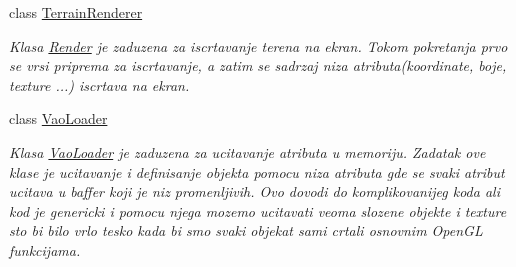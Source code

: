 \begin{DoxyCompactItemize}
class \hyperlink{classcore_1_1TerrainRenderer}{Terrain\+Renderer}
\begin{DoxyCompactList}\small\item\em Klasa \hyperlink{classcore_1_1Render}{Render} je zaduzena za iscrtavanje terena na ekran. Tokom pokretanja prvo se vrsi priprema za iscrtavanje, a zatim se sadrzaj niza atributa(koordinate, boje, texture ...) iscrtava na ekran. \end{DoxyCompactList}\item 
class \hyperlink{classcore_1_1VaoLoader}{Vao\+Loader}
\begin{DoxyCompactList}\small\item\em Klasa \hyperlink{classcore_1_1VaoLoader}{Vao\+Loader} je zaduzena za ucitavanje atributa u memoriju. Zadatak ove klase je ucitavanje i definisanje objekta pomocu niza atributa gde se svaki atribut ucitava u baffer koji je niz promenljivih. Ovo dovodi do komplikovanijeg koda ali kod je genericki i pomocu njega mozemo ucitavati veoma slozene objekte i texture sto bi bilo vrlo tesko kada bi smo svaki objekat sami crtali osnovnim Open\+GL funkcijama. \end{DoxyCompactList}\end{DoxyCompactItemize}
